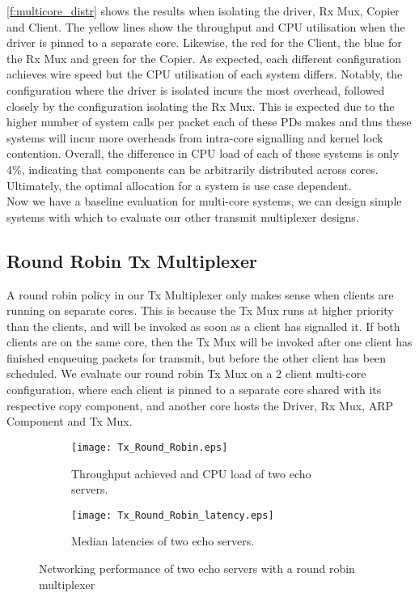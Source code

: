 \autoref{f:multicore_distr} shows the results when isolating the driver, Rx Mux, Copier and Client. The yellow lines show the throughput
and CPU utilisation when the driver is pinned to a separate core. 
Likewise, the red for the Client, the blue for the Rx Mux and green for
the Copier. As expected, each different configuration achieves wire speed but the CPU utilisation of each system differs. Notably, 
the configuration where the driver is isolated incurs the most overhead, followed closely by the configuration isolating the Rx Mux. This is 
expected due to the higher number of system calls per packet each of these PDs makes and thus these systems will incur more overheads from
intra-core signalling and kernel lock contention. Overall, the difference in CPU load of each of these systems is only 4\%, indicating that
components can be arbitrarily distributed across cores. Ultimately, the optimal allocation for a system is use case dependent.\\

Now we have a baseline evaluation for multi-core systems, we can design simple systems with which to evaluate our other transmit multiplexer
designs. 

\subsection{Round Robin Tx Multiplexer}

A round robin policy in our Tx Multiplexer only makes sense when clients are running on separate cores. This is because the Tx Mux runs at higher
priority than the clients, and will be invoked as soon as a client has signalled it. If both clients are on the same core, then the Tx Mux will
be invoked after one client has finished enqueuing packets for transmit, but before the other client has been scheduled. We evaluate our round robin
Tx Mux on a 2 client multi-core configuration, where each client is pinned to a separate core shared with its respective copy component, and another
core hosts the Driver, Rx Mux, ARP Component and Tx Mux. 

\noindent\begin{figure}[H]
    \centering
	\begin{multicols}{2}
		\begin{subfigure}[b]{0.45\textwidth}
        \centering
        \texttt{[image: Tx\_Round\_Robin.eps]}
        \caption{Throughput achieved and CPU load of two echo servers.}
        \label{f:round_robin_mux}
    \end{subfigure}\qquad
    \begin{subfigure}[b]{0.45\textwidth}
        \vspace{52pt}
        \centering
        \texttt{[image: Tx\_Round\_Robin\_latency.eps]}
        \vspace{0.5pt}
        \caption{Median latencies of two echo servers.}
        \label{f:round_robin_mux_latency}
    \end{subfigure}
\end{multicols}
\caption{Networking performance of two echo servers with a round robin multiplexer}
\end{figure}

